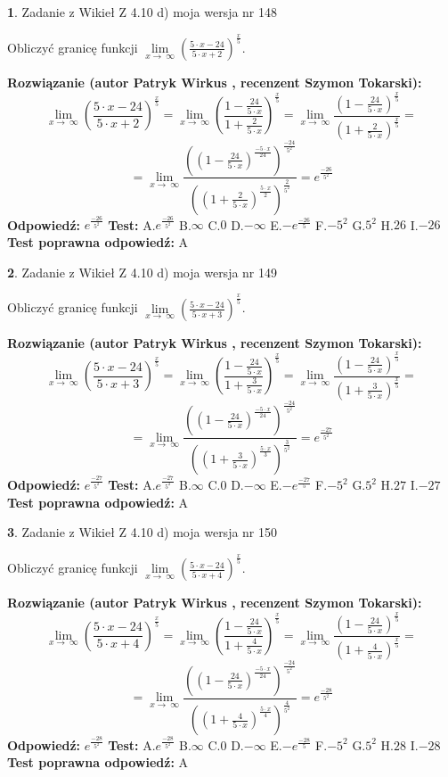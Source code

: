 \documentclass[12pt, a4paper]{article}
\theoremstyle{definition} %
\newtheorem{zad}{}
\newcommand{\zadStart}[1]{\begin{zad}#1\newline}
\newcommand{\zadStop}{\end{zad}}
\newcommand{\rozwStart}[2]{\noindent \textbf{Rozwiązanie (autor #1 , recenzent #2): }\newline}
\newcommand{\rozwStop}{\newline}
\newcommand{\odpStart}{\noindent \textbf{Odpowiedź:}\newline}
\newcommand{\odpStop}{\newline}
\newcommand{\testStart}{\noindent \textbf{Test:}\newline}
\newcommand{\testStop}{\newline}
\newcommand{\kluczStart}{\noindent \textbf{Test poprawna odpowiedź:}\newline}
\newcommand{\kluczStop}{\newline}
\begin{document}
\zadStart{Zadanie z Wikieł Z 4.10 d) moja wersja nr 148}


Obliczyć granicę funkcji  $\lim\limits_{x\to\ \infty}(\frac{5\cdot x-24}{5\cdot x+2})^{\frac{x}{5}}$.
\zadStop
\rozwStart{Patryk Wirkus}{Szymon Tokarski}
$$\lim\limits_{x\to\ \infty}(\frac{5\cdot x-24}{5\cdot x+2})^{\frac{x}{5}} = \lim\limits_{x\to\ \infty}(\frac{1-\frac{24}{5\cdot x}}{1+\frac{2}{5\cdot x}})^{\frac{x}{5}}=\lim\limits_{x\to\ \infty}\frac{(1-\frac{24}{5\cdot x})^{\frac{x}{5}}}{(1+\frac{2}{5\cdot x})^{\frac{x}{5}}}=$$
$$=\lim\limits_{x\to\ \infty}\frac{((1-\frac{24}{5\cdot x})^{\frac{-5\cdot x}{24}})^{\frac{-24}{5^{2}}}}{((1+\frac{2}{5\cdot x})^{\frac{5\cdot x}{2}})^{\frac{2}{5^{2}}}}=e^{\frac{-26}{5^{2}}}$$
\rozwStop
\odpStart
$e^{\frac{-26}{5^{2}}}$
\odpStop
\testStart
A.$e^{\frac{-26}{5^{2}}}$ B.$\infty$ C.$0$ D.$-\infty$ E.$-e^{\frac{-26}{5}}$
F.$-5^{2}$ G.$5^{2}$
H.$26$
I.$-26$
\testStop
\kluczStart
A
\kluczStop



\zadStart{Zadanie z Wikieł Z 4.10 d) moja wersja nr 149}


Obliczyć granicę funkcji  $\lim\limits_{x\to\ \infty}(\frac{5\cdot x-24}{5\cdot x+3})^{\frac{x}{5}}$.
\zadStop
\rozwStart{Patryk Wirkus}{Szymon Tokarski}
$$\lim\limits_{x\to\ \infty}(\frac{5\cdot x-24}{5\cdot x+3})^{\frac{x}{5}} = \lim\limits_{x\to\ \infty}(\frac{1-\frac{24}{5\cdot x}}{1+\frac{3}{5\cdot x}})^{\frac{x}{5}}=\lim\limits_{x\to\ \infty}\frac{(1-\frac{24}{5\cdot x})^{\frac{x}{5}}}{(1+\frac{3}{5\cdot x})^{\frac{x}{5}}}=$$
$$=\lim\limits_{x\to\ \infty}\frac{((1-\frac{24}{5\cdot x})^{\frac{-5\cdot x}{24}})^{\frac{-24}{5^{2}}}}{((1+\frac{3}{5\cdot x})^{\frac{5\cdot x}{3}})^{\frac{3}{5^{2}}}}=e^{\frac{-27}{5^{2}}}$$
\rozwStop
\odpStart
$e^{\frac{-27}{5^{2}}}$
\odpStop
\testStart
A.$e^{\frac{-27}{5^{2}}}$ B.$\infty$ C.$0$ D.$-\infty$ E.$-e^{\frac{-27}{5}}$
F.$-5^{2}$ G.$5^{2}$
H.$27$
I.$-27$
\testStop
\kluczStart
A
\kluczStop



\zadStart{Zadanie z Wikieł Z 4.10 d) moja wersja nr 150}


Obliczyć granicę funkcji  $\lim\limits_{x\to\ \infty}(\frac{5\cdot x-24}{5\cdot x+4})^{\frac{x}{5}}$.
\zadStop
\rozwStart{Patryk Wirkus}{Szymon Tokarski}
$$\lim\limits_{x\to\ \infty}(\frac{5\cdot x-24}{5\cdot x+4})^{\frac{x}{5}} = \lim\limits_{x\to\ \infty}(\frac{1-\frac{24}{5\cdot x}}{1+\frac{4}{5\cdot x}})^{\frac{x}{5}}=\lim\limits_{x\to\ \infty}\frac{(1-\frac{24}{5\cdot x})^{\frac{x}{5}}}{(1+\frac{4}{5\cdot x})^{\frac{x}{5}}}=$$
$$=\lim\limits_{x\to\ \infty}\frac{((1-\frac{24}{5\cdot x})^{\frac{-5\cdot x}{24}})^{\frac{-24}{5^{2}}}}{((1+\frac{4}{5\cdot x})^{\frac{5\cdot x}{4}})^{\frac{4}{5^{2}}}}=e^{\frac{-28}{5^{2}}}$$
\rozwStop
\odpStart
$e^{\frac{-28}{5^{2}}}$
\odpStop
\testStart
A.$e^{\frac{-28}{5^{2}}}$ B.$\infty$ C.$0$ D.$-\infty$ E.$-e^{\frac{-28}{5}}$
F.$-5^{2}$ G.$5^{2}$
H.$28$
I.$-28$
\testStop
\kluczStart
A
\kluczStop
\end{document}
